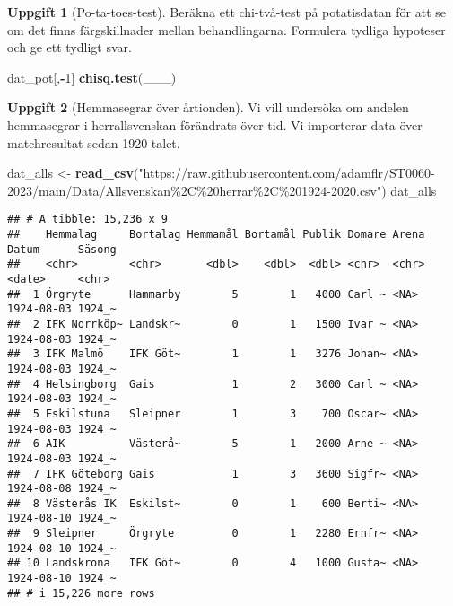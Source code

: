 \documentclass[
]{book}
\newenvironment{Shaded}{\begin{snugshade}}{\end{snugshade}}
\newcommand{\DecValTok}[1]{\textcolor[rgb]{0.00,0.00,0.81}{#1}}
\newcommand{\FunctionTok}[1]{\textcolor[rgb]{0.13,0.29,0.53}{\textbf{#1}}}
\newcommand{\NormalTok}[1]{#1}
\newcommand{\OtherTok}[1]{\textcolor[rgb]{0.56,0.35,0.01}{#1}}
\newcommand{\SpecialCharTok}[1]{\textcolor[rgb]{0.81,0.36,0.00}{\textbf{#1}}}
\newcommand{\StringTok}[1]{\textcolor[rgb]{0.31,0.60,0.02}{#1}}
\theoremstyle{definition}
\theoremstyle{definition}
\theoremstyle{definition}
\newtheorem{exercise}{Uppgift}[chapter]
\theoremstyle{definition}
\theoremstyle{remark}
\begin{document}
\begin{exercise}[Po-ta-toes-test]

Beräkna ett chi-två-test på potatisdatan för att se om det finns färgskillnader mellan behandlingarna. Formulera tydliga hypoteser och ge ett tydligt svar.

\begin{Shaded}
\begin{Highlighting}[]
\NormalTok{dat\_pot[,}\SpecialCharTok{{-}}\DecValTok{1}\NormalTok{]}
\FunctionTok{chisq.test}\NormalTok{(\_\_\_)}
\end{Highlighting}
\end{Shaded}

\end{exercise}

\begin{exercise}[Hemmasegrar över årtionden]

Vi vill undersöka om andelen hemmasegrar i herrallsvenskan förändrats över tid. Vi importerar data över matchresultat sedan 1920-talet.

\begin{Shaded}
\begin{Highlighting}[]
\NormalTok{dat\_alls }\OtherTok{\textless{}{-}} \FunctionTok{read\_csv}\NormalTok{(}\StringTok{"https://raw.githubusercontent.com/adamflr/ST0060{-}2023/main/Data/Allsvenskan\%2C\%20herrar\%2C\%201924{-}2020.csv"}\NormalTok{)}
\NormalTok{dat\_alls}
\end{Highlighting}
\end{Shaded}

\begin{verbatim}
## # A tibble: 15,236 x 9
##    Hemmalag     Bortalag Hemmamål Bortamål Publik Domare Arena Datum      Säsong
##    <chr>        <chr>       <dbl>    <dbl>  <dbl> <chr>  <chr> <date>     <chr> 
##  1 Örgryte      Hammarby        5        1   4000 Carl ~ <NA>  1924-08-03 1924_~
##  2 IFK Norrköp~ Landskr~        0        1   1500 Ivar ~ <NA>  1924-08-03 1924_~
##  3 IFK Malmö    IFK Göt~        1        1   3276 Johan~ <NA>  1924-08-03 1924_~
##  4 Helsingborg  Gais            1        2   3000 Carl ~ <NA>  1924-08-03 1924_~
##  5 Eskilstuna   Sleipner        1        3    700 Oscar~ <NA>  1924-08-03 1924_~
##  6 AIK          Västerå~        5        1   2000 Arne ~ <NA>  1924-08-03 1924_~
##  7 IFK Göteborg Gais            1        3   3600 Sigfr~ <NA>  1924-08-08 1924_~
##  8 Västerås IK  Eskilst~        0        1    600 Berti~ <NA>  1924-08-10 1924_~
##  9 Sleipner     Örgryte         0        1   2280 Ernfr~ <NA>  1924-08-10 1924_~
## 10 Landskrona   IFK Göt~        0        4   1000 Gusta~ <NA>  1924-08-10 1924_~
## # i 15,226 more rows
\end{verbatim}


\end{exercise}
\end{document}
